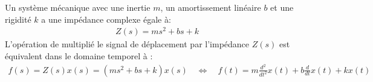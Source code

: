 
Un système mécanique avec une inertie $m$, un amortissement linéaire $b$ et une rigidité $k$ a une impédance complexe égale à:
\begin{align}
Z(s) = m s^2 + b s + k 
\end{align}
L'opération de multiplié le signal de déplacement par l'impédance $Z(s)$ est équivalent dans le domaine temporel à :
\begin{align}
f(s) = Z(s) x(s) = \left( m s^2 + b s + k \right) x(s) \quad \Longleftrightarrow \quad 
f(t) = m \frac{d^2}{dt^2} x(t) + b \frac{d}{dt} x(t) + k x(t) 
\end{align}



